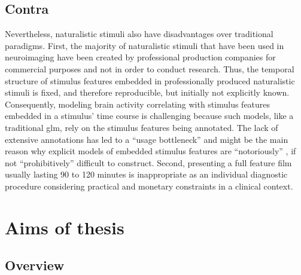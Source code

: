 

\subsection{Contra}
Nevertheless, naturalistic stimuli also have disadvantages over traditional
paradigms.
First, the majority of naturalistic stimuli that have been used in neuroimaging
have been created by professional production companies for commercial purposes
and not in order to conduct research.
Thus, the temporal structure of stimulus features embedded in professionally
produced naturalistic stimuli is fixed, and therefore reproducible, but
initially not explicitly known.
Consequently, modeling brain activity correlating with stimulus features
embedded in a stimulus' time course is challenging
\citep{saarimaki2021naturalistic, simony2020analysis} because such models, like
a traditional \ac{glm}, rely on the stimulus features being annotated.
The lack of extensive annotations has led to a ``usage bottleneck''
\citep{aliko2020naturalistic} and might be the main reason why explicit models
of embedded stimulus features are ``notoriously'' \citep{richard2019fast}, if
not ``prohibitively'' \citep{nastase2019measuring} difficult to construct.
Second, presenting a full feature film usually lasting 90 to 120 minutes is
inappropriate as an individual diagnostic procedure considering practical and
monetary constraints in a clinical context.
%


\section{Aims of thesis}



\subsection{Overview}




